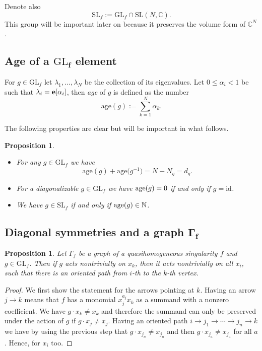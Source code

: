\documentclass[10pt,a4paper]{amsart}
\numberwithin{equation}{section}
\newtheorem{Proposition}[Theorem]{Proposition}
 { \theoremstyle{definition}
\newtheorem{Definition}[Theorem]{Definition}
\newtheorem{Note}[Theorem]{Note}
\newtheorem{Example}[Theorem]{Example}
\newtheorem{Remark}[Theorem]{Remark} }
\newcommand{\CC}{{\mathbb{C}}}
\newcommand{\NN}{{\mathbb{N}}}
\newcommand{\SL}{{\mathrm{SL}}}
\newcommand{\GL}{{\mathrm{GL}}}
\newcommand{\epi}{{\bf e}}
\newcommand{\id}{\mathrm{id}}
\newcommand{\age}{\mathrm{age}}
\begin{document}
Denote also
\[
\SL_f:=\GL_f\cap\SL(N,\CC).
\]
This group will be important later on because it preserves the volume form of $\CC^N$.

\subsection[Age of a GL\_f element]{Age of a $\boldsymbol{\GL_f}$ element}

For $g\in \GL_f$ let $\lambda_1,\ldots,\lambda_N$ be the collection of its eigenvalues. Let $0\le \alpha_i < 1$ be such that $\lambda_i=\epi[\alpha_i]$, then {\em age} of $g$ is defined as the number
\begin{equation*}%
\age(g) := \sum_{k=1}^N \alpha_k.
\end{equation*}

The following properties are clear but will be important in what follows.

\begin{Proposition}\label{prop: integral age}\quad
\begin{itemize}\itemsep=0pt
\item[$(1)$] For any $g \in \GL_f$ we have
\begin{equation}\label{eq: age g and inverse}
		\age(g) + \age\bigl(g^{-1}\bigr) = N - N_g = d_g.
\end{equation}

\item[$(2)$] For a diagonalizable $g\in \GL_f$ we have ${\rm age}(g) = 0$ if and only if $g = \id$.

\item[$(3)$] We have $g\in \SL_f$ if and only if ${\rm age}(g)\in\NN$.
\end{itemize}
\end{Proposition}

\subsection[Diagonal symmetries and a graph Gamma\_f]{Diagonal symmetries and a graph $\boldsymbol{\Gamma_f}$}

\begin{Proposition}\label{prop: group elements on graph}
	Let $\Gamma_f$ be a graph of a quasihomogeneous singularity $f$ and $g \in \GL_f$. Then if $g$ acts nontrivially on $x_k$, then it acts nontrivially on all $x_i$, such that there is an oriented path from $i$-th to the $k$-th vertex.
\end{Proposition}
\begin{proof}
 We first show the statement for the arrows pointing at $k$.
 Having an arrow $j \to k$ means that $f$ has a monomial $x_j^{a_j}x_k$ as a summand with a nonzero coefficient. We have $g \cdot x_k \neq x_k$ and therefore the summand can only be preserved under the action of $g$ if $g\cdot x_j \neq x_j$. Having an oriented path $i \to j_1 \to \cdots \to j_n \to k$ we have by using the previous step that $g \cdot x_{j_n} \neq x_{j_n}$ and then $g \cdot x_{j_a} \neq x_{j_a}$ for all $a$. Hence, for $x_i$ too.
\end{proof}
\end{document}

